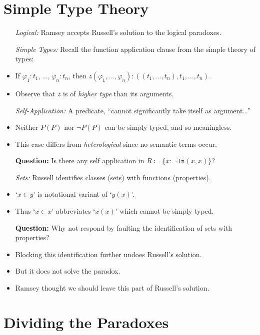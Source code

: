 \documentclass[a4paper, 11pt]{article} %
\newcommand{\set}[1]{\lbrace#1\rbrace} %
\begin{document}
\section*{Simple Type Theory}

  \begin{itemize}
    \item[\it Logical:] Ramsey accepts Russell's solution to the logical paradoxes.
    \item[\it Simple Types:] Recall the function application clause from the simple theory of types:
      \item If $\varphi_1 : t_1$, \ldots, $\varphi_n : t_n$, then $z(\varphi_1,\ldots,\varphi_n) : ((t_1,\ldots,t_n),t_1,\ldots,t_n)$.
      \item Observe that $z$ is of \textit{higher type} than its arguments. 
    \item[\it Self-Application:] A predicate, ``cannot significantly take itself as argument\ldots''
      \item Neither $P(P)$ nor $\neg P(P)$ can be simply typed, and so meaningless. 
      \item This case differs from \textit{heterological} since no semantic terms occur.
    \item[\bf Question:] Is there any self application in $R \coloneq \set{ x : \neg \texttt{In}(x,x) }$?
    \item[\it Sets:] Russell identifies classes (sets) with functions (properties). 
      \item `$x \in y$' is notational variant of `$y(x)$'.
      \item Thus `$x \in x$' abbreviates `$x(x)$' which cannot be simply typed.
    \item[\bf Question:] Why not respond by faulting the identification of sets with properties?
      \item Blocking this identification further undoes Russell's solution.
      \item But it does not solve the paradox.
      \item Ramsey thought we should leave this part of Russell's solution.
  \end{itemize}




\section*{Dividing the Paradoxes}
\end{document}
